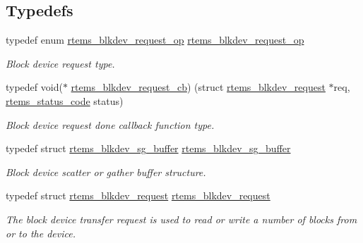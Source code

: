 \subsection*{Typedefs}
\begin{DoxyCompactItemize}
\item 
typedef enum \mbox{\hyperlink{group__rtems__blkdev_ga36465495f1b9e28347838751ca90f0fe}{rtems\+\_\+blkdev\+\_\+request\+\_\+op}} \mbox{\hyperlink{group__rtems__blkdev_ga3f09489ef7c88b70744a747573f5b741}{rtems\+\_\+blkdev\+\_\+request\+\_\+op}}
\begin{DoxyCompactList}\small\item\em Block device request type. \end{DoxyCompactList}\item 
\mbox{\label{group__rtems__blkdev_ga64a394fd9c40d7e2d1d22441741b6c83}} 
typedef void($\ast$ \mbox{\hyperlink{group__rtems__blkdev_ga64a394fd9c40d7e2d1d22441741b6c83}{rtems\+\_\+blkdev\+\_\+request\+\_\+cb}}) (struct \mbox{\hyperlink{structrtems__blkdev__request}{rtems\+\_\+blkdev\+\_\+request}} $\ast$req, \mbox{\hyperlink{group__ClassicStatus_ga545d41846817eaba6143d52ee4d9e9fe}{rtems\+\_\+status\+\_\+code}} status)
\begin{DoxyCompactList}\small\item\em Block device request done callback function type. \end{DoxyCompactList}\item 
\mbox{\label{group__rtems__blkdev_ga78d471b21ee2156476d4aa0b1cf0abe0}} 
typedef struct \mbox{\hyperlink{structrtems__blkdev__sg__buffer}{rtems\+\_\+blkdev\+\_\+sg\+\_\+buffer}} \mbox{\hyperlink{group__rtems__blkdev_ga78d471b21ee2156476d4aa0b1cf0abe0}{rtems\+\_\+blkdev\+\_\+sg\+\_\+buffer}}
\begin{DoxyCompactList}\small\item\em Block device scatter or gather buffer structure. \end{DoxyCompactList}\item 
typedef struct \mbox{\hyperlink{structrtems__blkdev__request}{rtems\+\_\+blkdev\+\_\+request}} \mbox{\hyperlink{group__rtems__blkdev_gac77b556344073a161224333b6c605608}{rtems\+\_\+blkdev\+\_\+request}}
\begin{DoxyCompactList}\small\item\em The block device transfer request is used to read or write a number of blocks from or to the device. \end{DoxyCompactList}\end{DoxyCompactItemize}
